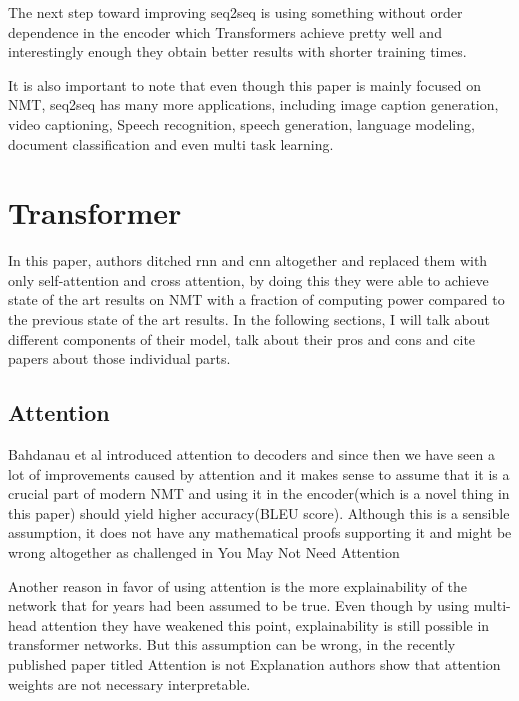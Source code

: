 \documentclass{article}
\begin{document}
The next step toward improving seq2seq is using something without order dependence in the encoder which Transformers achieve pretty well and interestingly enough they obtain better results with shorter training times.

It is also important to note that even though this paper is mainly focused on NMT, seq2seq has many more applications, including image caption generation\citep{1411.4555}, video captioning\citep{1505.00487}, Speech recognition\citep{1712.01769}, speech generation\citep{1609.03499}, language modeling\citep{1810.04805}, document classification\citep{1707.00896} and even multi task learning\citep{1706.05137}.

\section{Transformer}
In this paper, authors ditched rnn and cnn altogether and replaced them with only self-attention and cross attention, by doing this they were able to achieve state of the art results on NMT with a fraction of computing power compared to the previous state of the art results.
In the following sections, I will talk about different components of their model, talk about their pros and cons and cite papers about those individual parts.

\subsection{Attention}
Bahdanau et al\citep{1409.0473} introduced attention to decoders and since then we have seen a lot of improvements caused by attention\citep{1611.04558} and it makes sense to assume that it is a crucial part of modern NMT and using it in the encoder(which is a novel thing in this paper) should yield higher accuracy(BLEU score). Although this is a sensible assumption, it does not have any mathematical proofs supporting it and might be wrong altogether as challenged in You May Not Need Attention\citep{1810.13409}

Another reason in favor of using attention is the more explainability of the network that for years had been assumed to be true. Even though by using multi-head attention they have weakened this point, explainability is still possible in transformer networks\citep{1809.03985}. But this assumption can be wrong, in the recently published paper titled Attention is not Explanation\citep{1902.10186} authors show that attention weights are not necessary interpretable.
\end{document}
